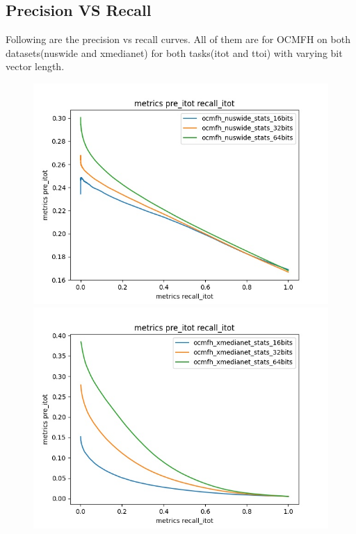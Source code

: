 \newpage
\subsection{Precision VS Recall}
    Following are the precision vs recall curves. All of them are for OCMFH\cite{ocmfh} on both datasets(nuswide and xmedianet) for both tasks(itot and ttoi) with varying bit vector length.
        \begin{figure}[H]
            \begin{minipage}[!h]{0.6\linewidth}
                \centering
                \includegraphics[width=\linewidth]{resultsImages/precisionVsRecall/metrics pre_itot recall_itot_ocmfh_nuswide.jpeg}
            \end{minipage}
            \begin{minipage}[!h]{0.6\linewidth}
                \centering
                \includegraphics[width=\linewidth]{resultsImages/precisionVsRecall/metrics pre_itot recall_itot_ocmfh_xmedia.jpeg}

\end{minipage}
\end{figure}
